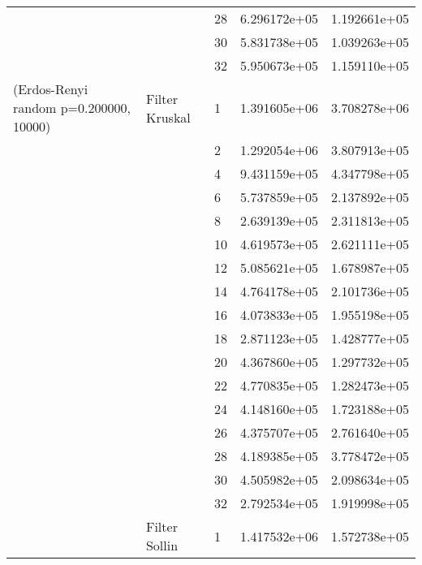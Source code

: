 \begin{tabular}{lllrr}
                      &                     & 28 &  6.296172e+05 &  1.192661e+05 \\
                      &                     & 30 &  5.831738e+05 &  1.039263e+05 \\
                      &                     & 32 &  5.950673e+05 &  1.159110e+05 \\
(Erdos-Renyi random p=0.200000, 10000) & Filter Kruskal & 1  &  1.391605e+06 &  3.708278e+06 \\
                      &                     & 2  &  1.292054e+06 &  3.807913e+05 \\
                      &                     & 4  &  9.431159e+05 &  4.347798e+05 \\
                      &                     & 6  &  5.737859e+05 &  2.137892e+05 \\
                      &                     & 8  &  2.639139e+05 &  2.311813e+05 \\
                      &                     & 10 &  4.619573e+05 &  2.621111e+05 \\
                      &                     & 12 &  5.085621e+05 &  1.678987e+05 \\
                      &                     & 14 &  4.764178e+05 &  2.101736e+05 \\
                      &                     & 16 &  4.073833e+05 &  1.955198e+05 \\
                      &                     & 18 &  2.871123e+05 &  1.428777e+05 \\
                      &                     & 20 &  4.367860e+05 &  1.297732e+05 \\
                      &                     & 22 &  4.770835e+05 &  1.282473e+05 \\
                      &                     & 24 &  4.148160e+05 &  1.723188e+05 \\
                      &                     & 26 &  4.375707e+05 &  2.761640e+05 \\
                      &                     & 28 &  4.189385e+05 &  3.778472e+05 \\
                      &                     & 30 &  4.505982e+05 &  2.098634e+05 \\
                      &                     & 32 &  2.792534e+05 &  1.919998e+05 \\
                      & Filter Sollin & 1  &  1.417532e+06 &  1.572738e+05 \\

\end{tabular}
